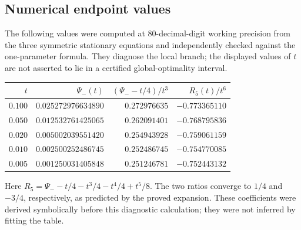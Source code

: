 \documentclass[11pt]{article}
\theoremstyle{definition}
\newcommand{\1}{\mathbf 1}
\begin{document}
\subsection{Numerical endpoint values}
The following values were computed at 80-decimal-digit working precision from the three symmetric stationary equations and independently checked against the one-parameter formula. They diagnose the local branch; the displayed values of $t$ are not asserted to lie in a certified global-optimality interval.
\begin{center}
\begin{tabular}{@{}rrrr@{}}
\toprule
$t$ & $\Psi_-(t)$ & $(\Psi_--t/4)/t^3$ & $R_5(t)/t^6$\\
\midrule
$0.100$ & $0.025272976634890$ & $0.272976635$ & $-0.773365110$\\
$0.050$ & $0.012532761425065$ & $0.262091401$ & $-0.768795836$\\
$0.020$ & $0.005002039551420$ & $0.254943928$ & $-0.759061159$\\
$0.010$ & $0.002500252486745$ & $0.252486745$ & $-0.754770085$\\
$0.005$ & $0.001250031405848$ & $0.251246781$ & $-0.752443132$\\
\bottomrule
\end{tabular}
\end{center}
Here $R_5=\Psi_--t/4-t^3/4-t^4/4+t^5/8$. The two ratios converge to $1/4$ and $-3/4$, respectively, as predicted by the proved expansion. These coefficients were derived symbolically before this diagnostic calculation; they were not inferred by fitting the table.
\end{document}
